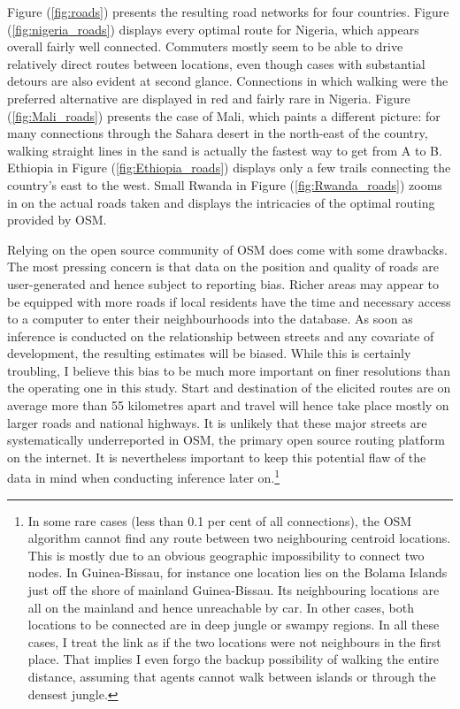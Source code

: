 \documentclass[11pt, oneside]{article}   	%
\let\oldref\ref
\renewcommand{\ref}[1]{(\oldref{#1})}
\begin{document}
Figure \ref{fig:roads} presents the resulting road networks for four countries. Figure \ref{fig:nigeria_roads} displays every optimal route for Nigeria, which appears overall fairly well connected. Commuters mostly seem to be able to drive relatively direct routes between locations, even though cases with substantial detours are also evident at second glance. Connections in which walking were the preferred alternative are displayed in red and fairly rare in Nigeria. Figure \ref{fig:Mali_roads} presents the case of Mali, which paints a different picture: for many connections through the Sahara desert in the north-east of the country, walking straight lines in the sand is actually the fastest way to get from A to B. Ethiopia in Figure \ref{fig:Ethiopia_roads} displays only a few trails connecting the country's east to the west. Small Rwanda in Figure \ref{fig:Rwanda_roads} zooms in on the actual roads taken and displays the intricacies of the optimal routing provided by OSM.

Relying on the open source community of OSM does come with some drawbacks. The most pressing concern is that data on the position and quality of roads are user-generated and hence subject to reporting bias. Richer areas may appear to be equipped with more roads if local residents have the time and necessary access to a computer to enter their neighbourhoods into the database. As soon as inference is conducted on the relationship between streets and any covariate of development, the resulting estimates will be biased. While this is certainly troubling, I believe this bias to be much more important on finer resolutions than the operating one in this study. Start and destination of the elicited routes are on average more than 55 kilometres apart and travel will hence take place mostly on larger roads and national highways. It is unlikely that these major streets are systematically underreported in OSM, the primary open source routing platform on the internet. It is nevertheless important to keep this potential flaw of the data in mind when conducting inference later on.\footnote{In some rare cases (less than 0.1 per cent of all connections), the OSM algorithm cannot find any route between two neighbouring centroid locations. This is mostly due to an obvious geographic impossibility to connect two nodes. In Guinea-Bissau, for instance one location lies on the Bolama Islands just off the shore of mainland Guinea-Bissau. Its neighbouring locations are all on the mainland and hence unreachable by car. In other cases, both locations to be connected are in deep jungle or swampy regions. In all these cases, I treat the link as if the two locations were not neighbours in the first place. That implies I even forgo the backup possibility of walking the entire distance, assuming that agents cannot walk between islands or through the densest jungle.}
\end{document}
